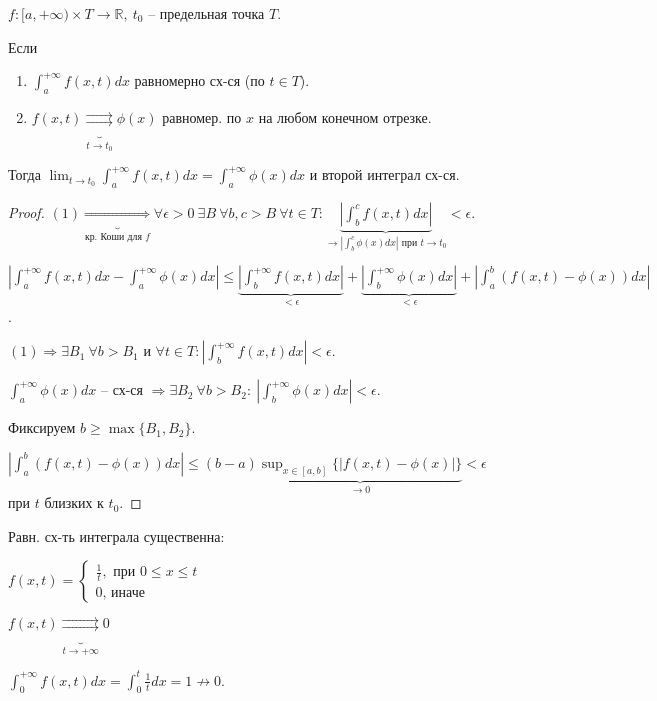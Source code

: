 \begin{theorem}
    $f: [a, +\infty) \times T \rightarrow \mathbb{R}, \ t_0$ -- предельная точка $T$.

    Если
    \begin{enumerate}
        \item {
            $\int_{a}^{+\infty} { f(x, t) dx }$ равномерно сх-ся (по $t \in T$).
        }
        \item {
            $f(x, t) \underbrace{\rightrightarrows}_{t \rightarrow t_0} \phi(x)$ равномер. по $x$ на любом конечном отрезке.
        }
    \end{enumerate}

    Тогда $\lim_{t \rightarrow t_0} { \int_{a}^{+\infty} { f(x, t) dx } } = \int_{a}^{+\infty} { \phi(x) dx }$ и второй интеграл сх-ся. 
\end{theorem}

\begin{proof}
    $(1) \underbrace{\Rightarrow}_{\text{кр. Коши для }f} \forall \epsilon > 0 \ \exists B \ \forall b, c > B \ \forall t \in T: \underbrace{| \int_{b}^{c} { f(x, t) dx } |}_{\rightarrow |\int_{b}^{c} { \phi(x) dx }| \text { при } t \rightarrow t_0}  < \epsilon$.

    $| \int_{a}^{+\infty} { f(x, t) dx } - \int_{a}^{+\infty} {\phi(x) dx} | \leq \underbrace{| \int_{b}^{+\infty} { f(x, t) dx } |}_{< \epsilon} + \underbrace{| \int_{b}^{+\infty} { \phi(x) dx } |}_{< \epsilon} + |\int_{a}^{b} { \left( f(x, t) - \phi(x) \right) dx }|$.

    $(1) \Rightarrow \exists B_1 \ \forall b > B_1$ и $\forall t \in T: | \int_{b}^{+\infty} { f(x, t) dx } | < \epsilon$.

    $\int_{a}^{+\infty} { \phi(x) dx }$ -- сх-ся $\Rightarrow \exists B_2 \ \forall b > B_2: \ | \int_{b}^{+\infty} { \phi(x) dx } | < \epsilon$.

    Фиксируем $b \geq \max \{ B_1, B_2 \}$.

    $| \int_{a}^{b} {\left( f(x, t) - \phi(x) \right) dx} | \leq (b - a) \underbrace{\sup_{x \in [a, b]} \{ | f(x, t) - \phi(x) | \}}_{\rightarrow 0} < \epsilon$ при $t$ близких к $t_0$. 
\end{proof}

\begin{remark}
    Равн. сх-ть интеграла существенна:

    $f(x, t) = \begin{cases}
        \frac{1}{t}, \text{ при } 0 \leq x \leq t \\
        0 \text{, иначе}
    \end{cases}$

    $f(x, t) \underbrace{\rightrightarrows}_{t \rightarrow + \infty} 0$

    $\int_{0}^{+\infty} { f(x, t) dx} = \int_{0}^{t} { \frac{1}{t} dx } = 1 \not \rightarrow 0 $.
\end{remark}

